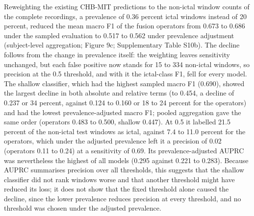 \documentclass[11pt,a4paper]{article}
\begin{document}
Reweighting the existing CHB-MIT predictions to the non-ictal window counts of the
complete recordings, a prevalence of 0.36 percent ictal windows instead of 20 percent,
reduced the mean macro F1 of the fusion operators from 0.673 to 0.686 under the sampled
evaluation to 0.517 to 0.562 under prevalence adjustment (subject-level aggregation;
Figure 9c; Supplementary Table S10b). The decline follows from the change in prevalence
itself: the weighting leaves sensitivity unchanged, but each false positive now stands
for 15 to 334 non-ictal windows, so precision at the 0.5 threshold, and with it the
ictal-class F1, fell for every model. The shallow classifier, which had the highest
sampled macro F1 (0.690), showed the largest decline in both absolute and relative terms
(to 0.454, a decline of 0.237 or 34 percent, against 0.124 to 0.160 or 18 to 24 percent
for the operators) and had the lowest prevalence-adjusted macro F1; pooled aggregation
gave the same order (operators 0.483 to 0.500, shallow 0.447). At 0.5 it labelled 21.5
percent of the non-ictal test windows as ictal, against 7.4 to 11.0 percent for the
operators, which under the adjusted prevalence left it a precision of 0.02 (operators
0.11 to 0.24) at a sensitivity of 0.69. Its prevalence-adjusted AUPRC was nevertheless the
highest of all models (0.295 against 0.221 to 0.283). Because AUPRC summarises precision
over all thresholds, this suggests that the shallow classifier did not rank windows
worse and that another threshold might have reduced its loss; it does not show that the
fixed threshold alone caused the decline, since the lower prevalence reduces precision
at every threshold, and no threshold was chosen under the adjusted prevalence.
\end{document}
